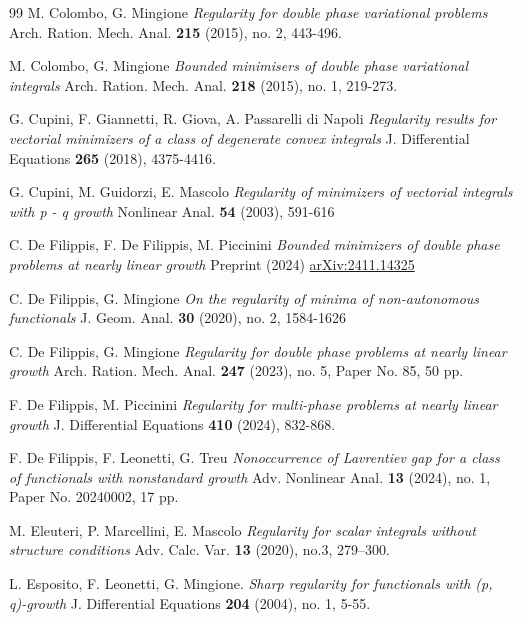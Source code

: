 \documentclass[a4paper,10pt]{article}
\theoremstyle{plain}
\theoremstyle{definition}
\numberwithin{equation}{section} \makeatletter
\begin{document}
\begin{thebibliography}{99}
 M. Colombo, G. Mingione 
{\em Regularity for double phase variational problems} Arch.
Ration. Mech. Anal. {\bf 215} (2015), no. 2, 443-496.

M. Colombo, G. Mingione {\em Bounded minimisers of double phase variational integrals} 
Arch. Ration. Mech. Anal. {\bf 218} (2015), no. 1, 219-273.

G. Cupini, F. Giannetti, R. Giova, A. Passarelli di Napoli {\em Regularity results for
vectorial minimizers of a class of degenerate convex integrals} J. Differential Equations
{\bf 265} (2018), 4375-4416.

 G. Cupini, M. Guidorzi, E. Mascolo {\em Regularity of minimizers of vectorial integrals
with p - q growth} Nonlinear Anal. {\bf 54} (2003), 591-616

C. De Filippis, F. De Filippis, M. Piccinini {\em Bounded minimizers of double phase problems at nearly linear growth} Preprint (2024) \href{https://doi.org/10.48550/arXiv.2411.14325}{arXiv:2411.14325}

C. De Filippis, G. Mingione {\em On the regularity of minima of non-autonomous functionals} 
J. Geom. Anal. {\bf 30} (2020), no. 2, 1584-1626

C. De Filippis, G. Mingione
{\em 
Regularity for double phase problems at nearly linear growth}
Arch. Ration. Mech. Anal. {\bf 247}  (2023), no. 5, Paper No. 85, 50 pp.




F. De Filippis, M. Piccinini
{\em 
Regularity for multi-phase problems at nearly linear growth} 
J. Differential Equations {\bf 410} (2024), 832-868.

F. De Filippis, F. Leonetti, G. Treu
{\em Nonoccurrence of Lavrentiev gap for a class
of functionals with nonstandard growth}
Adv. Nonlinear Anal. {\bf 13} (2024), no. 1, Paper No. 20240002, 17 pp.


M. Eleuteri, P. Marcellini, E. Mascolo 
{\em Regularity for scalar integrals without structure conditions} 
Adv. Calc. Var. {\bf 13} (2020), no.3, 279–300.

L. Esposito, F. Leonetti, G. Mingione. {\em Sharp regularity for functionals with (p, q)-growth} {J. Differential Equations} {\bf 204}
(2004), no. 1, 5-55.


\end{thebibliography}
\end{document}
